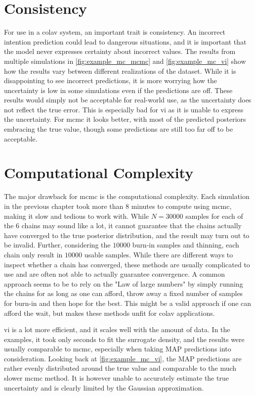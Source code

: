 \section{Consistency}
For use in a \acrshort{colav} system, an important trait is consistency. An incorrect intention prediction could lead to dangerous situations, and it is important that the model never expresses certainty about incorrect values. The results from multiple simulations in \cref{fig:example_mc_mcmc} and \cref{fig:example_mc_vi} show how the results vary between different realizations of the dataset. While it is disappointing to see incorrect predictions, it is more worrying how the uncertainty is low in some simulations even if the predictions are off. These results would simply not be acceptable for real-world use, as the uncertainty does not reflect the true error. This is especially bad for \acrshort{vi} as it is unable to express the uncertainty. For \acrshort{mcmc} it looks better, with most of the predicted posteriors embracing the true value, though some predictions are still too far off to be acceptable. 

\section{Computational Complexity}
The major drawback for \acrshort{mcmc} is the computational complexity. Each simulation in the previous chapter took more than 8 minutes to compute using \acrshort{mcmc}, making it slow and tedious to work with. While $N=30000$ samples for each of the $6$ chains may sound like a lot, it cannot guarantee that the chains actually have converged to the true posterior distribution, and the result may turn out to be invalid. Further, considering the $10000$ burn-in samples and thinning, each chain only result in $10000$ usable samples. While there are different ways to inspect whether a chain has converged, these methods are usually complicated to use and are often not able to actually guarantee convergence. A common approach seems to be to rely on the "Law of large numbers" by simply running the chains for as long as one can afford, throw away a fixed number of samples for burn-in and then hope for the best. This might be a valid approach if one can afford the wait, but makes these methods unfit for \acrshort{colav} applications.  

\acrshort{vi} is a lot more efficient, and it scales well with the amount of data. In the examples, it took only seconds to fit the surrogate density, and the results were usually comparable to \acrshort{mcmc}, especially when taking MAP predictions into consideration. Looking back at \cref{fig:example_mc_vi}, the MAP predictions are rather evenly distributed around the true value and comparable to the much slower \acrshort{mcmc} method. It is however unable to accurately estimate the true uncertainty and is clearly limited by the Gaussian approximation.    



